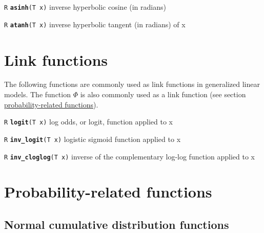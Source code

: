 \documentclass[
  10pt,
]{book}
\begin{document}

\texttt{R} \textbf{\texttt{asinh}}\texttt{(T\ x)}\newline
inverse hyperbolic cosine (in radians)


\texttt{R} \textbf{\texttt{atanh}}\texttt{(T\ x)}\newline
inverse hyperbolic tangent (in radians) of x

\hypertarget{link-functions}{%
\section{Link functions}\label{link-functions}}

The following functions are commonly used as link functions in
generalized linear models. The function \(\Phi\) is also commonly used
as a link function (see section \protect\hyperlink{Phi-function}{probability-related functions}).


\texttt{R} \textbf{\texttt{logit}}\texttt{(T\ x)}\newline
log odds, or logit, function applied to x


\texttt{R} \textbf{\texttt{inv\_logit}}\texttt{(T\ x)}\newline
logistic sigmoid function applied to x


\texttt{R} \textbf{\texttt{inv\_cloglog}}\texttt{(T\ x)}\newline
inverse of the complementary log-log function applied to x

\hypertarget{Phi-function}{%
\section{Probability-related functions}\label{Phi-function}}

\hypertarget{normal-cumulative-distribution-functions}{%
\subsection{Normal cumulative distribution functions}\label{normal-cumulative-distribution-functions}}
\end{document}
